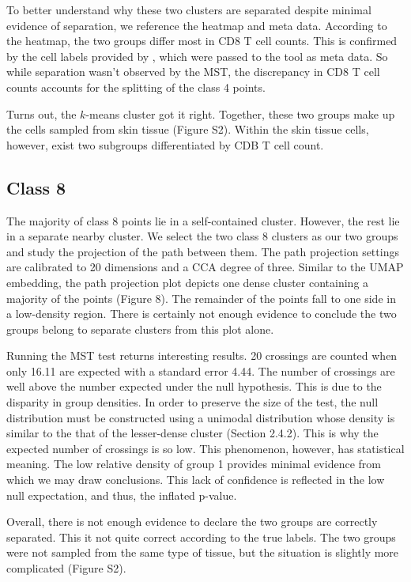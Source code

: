 \documentclass{article}
\begin{document}
{To better understand why these two clusters are separated despite minimal evidence of separation, we reference the heatmap and meta data. According to the heatmap, the two groups differ most in CD8 T cell counts. This is confirmed by the cell labels provided by \cite{UMAP example}, which were passed to the tool as meta data. So while separation wasn't observed by the MST, the discrepancy in CD8 T cell counts accounts for the splitting of the class 4 points.

Turns out, the $k$-means cluster got it right. Together, these two groups make up the cells sampled from skin tissue (Figure S2). Within the skin tissue cells, however, exist two subgroups differentiated by CDB T cell count.

\subsection{Class 8}
The majority of class 8 points lie in a self-contained cluster. However, the rest lie in a separate nearby cluster. We select the two class 8 clusters as our two groups and study the projection of the path between them. The path projection settings are calibrated to 20 dimensions and a CCA degree of three. Similar to the UMAP embedding, the path projection plot depicts one dense cluster containing a majority of the points (Figure 8). The remainder of the points fall to one side in a low-density region. There is certainly not enough evidence to conclude the two groups belong to separate clusters from this plot alone.

Running the MST test returns interesting results. 20 crossings are counted when only 16.11 are expected with a standard error 4.44. The number of crossings are well above the number expected under the null hypothesis. This is due to the disparity in group densities. In order to preserve the size of the test, the null distribution must be constructed using a unimodal distribution whose density is similar to the that of the lesser-dense cluster (Section 2.4.2). This is why the expected number of crossings is so low. This phenomenon, however, has statistical meaning. The low relative density of group 1 provides minimal evidence from which we may draw conclusions. This lack of confidence is reflected in the low null expectation, and thus, the inflated p-value.

Overall, there is not enough evidence to declare the two groups are correctly separated. This it not quite correct according to the true labels. The two groups were not sampled from the same type of tissue, but the situation is slightly more complicated (Figure S2).

}
\end{document}
